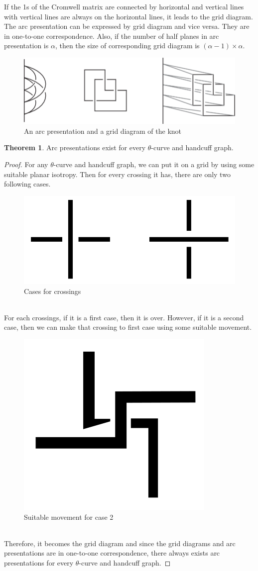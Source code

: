 \documentclass{article}
\theoremstyle{definition}
\theoremstyle{theorem}
\newtheorem{theorem}[thm]{Theorem}
\theoremstyle{proposition}
\theoremstyle{corollary}
\begin{document}
If the 1s of the Cromwell matrix are connected by horizontal and vertical lines with vertical lines are always on the horizontal lines, it leads to the grid diagram. The arc presentation can be expressed by grid diagram and vice versa. They are in one-to-one correspondence. Also, if the number of half planes in arc presentation is $\alpha$, then the size of corresponding grid diagram is $(\alpha - 1) \times \alpha$.\\

\begin{figure}[h]
    \centerline{\includegraphics[width=0.5\linewidth]{An arc presentation and a grid diagram of the knot.png}}
    \caption{An arc presentation and a grid diagram of the knot}
    \label{figure_2}
\end{figure}

\begin{theorem}
    Arc presentations exist for every $\theta$-curve and handcuff graph. 
\end{theorem}
\begin{proof}
    For any $\theta$-curve and handcuff graph, we can put it on a grid by using some suitable planar isotropy.
    Then for every crossing it has, there are only two following cases. \\
    \begin{figure}[h]
        \centerline{\includegraphics[width=0.5\linewidth]{figure/crossings.png}}
        \caption{Cases for crossings}
        \label{figure_2}
    \end{figure}
    \\ For each crossings, if it is a first case, then it is over.
    However, if it is a second case, then we can make that crossing to first case using some suitable movement. \\
    \begin{figure}[h]
        \centerline{\includegraphics[width=0.25\linewidth]{figure/move crossing.png}}
        \caption{Suitable movement for case 2}
        \label{figure_2}
    \end{figure}
    \\ Therefore, it becomes the grid diagram and since the grid diagrams and arc presentations are in one-to-one correspondence, there always exists arc presentations for every $\theta$-curve and handcuff graph.
\end{proof}
\end{document}
